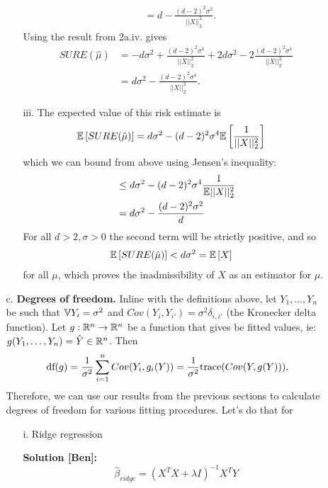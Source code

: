 \documentclass[11pt]{article}
\begin{document}
\begin{enumerate}
\begin{itemize}
\begin{itemize}
\begin{align*}
        & = d - \frac{(d - 2)^2\sigma^2}{||X||_2^2}.
      \end{align*}
      Using the result from 2a.iv. gives
      \begin{align*}
        SURE(\hat{\mu}) & = -d\sigma^2 + \frac{(d - 2)^2\sigma^4}{||X||_2^2}
        + 2d\sigma^2 - 2\frac{(d - 2)^2\sigma^4}{||X||_2^2}\\
        & = d\sigma^2 - \frac{(d - 2)^2\sigma^4}{||X||_2^2}.
      \end{align*}
    \item[iii.]
      The expected value of this risk estimate is
      \begin{align*}
        \mathbb{E}\left[SURE(\hat{\mu})\right] & = d\sigma^2
        - (d - 2)^2\sigma^4\mathbb{E}\left[\frac{1}{||X||_2^2}\right]
      \end{align*}
      which we can bound from above using Jensen's inequality:
      \begin{align*}
        & \leq d\sigma^2
        - (d - 2)^2\sigma^4\frac{1}{\mathbb{E}||X||_2^2}\\
        & = d\sigma^2 - \frac{(d - 2)^2 \sigma^2}{d}
      \end{align*}
      For all $d > 2, \sigma > 0$ the second term will be strictly positive, and so
      \begin{align*}
        \mathbb{E}\left[SURE(\hat{\mu})\right] &< d\sigma^2 = \mathbb{E}\left[X\right]
      \end{align*}
      for all $\mu$, which proves the inadmissibility of $X$ as an estimator for
      $\mu$.
    \end{itemize}

  \item[c.] \textbf{Degrees of freedom.}  Inline with the definitions above, let
    $Y_1,\ldots,Y_n$ be such that $\mathbb{V} Y_i = \sigma^2$ and $Cov(Y_i,Y_{i'}) =
    \sigma^2 \delta_{i,i'}$ (the Kronecker delta function).  Let $g: \mathbb{R}^n
    \rightarrow \mathbb{R}^n$ be a function that gives be fitted values, ie:
    $g(Y_1,\ldots,Y_n) = \hat{Y} \in \mathbb{R}^n$.  Then
    \[
    \textrm{df}(g) = \frac{1}{\sigma^2} \sum_{i=1}^n Cov(Y_i,g_i(Y)) = \frac{1}{\sigma^2}
    \textrm{trace}( Cov(Y,g(Y))).
    \]
    Therefore, we can use our results from the previous sections to calculate
    degrees of freedom for various fitting procedures.  Let's do that for
    \begin{itemize}
    \item[i.] Ridge regression

      \textbf{Solution [Ben]:}
      \begin{equation*}
        \hat{{\beta}}_{ridge}=(X^TX+\lambda I)^{-1}X^TY
      \end{equation*}
      

\end{itemize}
\end{itemize}
\end{enumerate}
\end{document}
